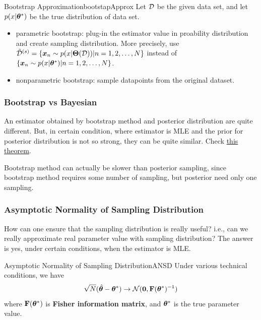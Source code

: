 \documentclass{report}
\begin{document}
                \begin{defn}{Bootstrap Approximation}{bootstapApprox}
                    Let $\mathcal D$ be the given data set, and let $p(x|\boldsymbol{\theta}^*)$ be the true distribution of data set.
                    \begin{itemize}
                        \item parametric bootstrap: plug-in the estimator value in proability distribution and create sampling distribution.
                            More precisely, use $\tilde{\mathcal D}^{(s)} = \{\boldsymbol{x}_n \sim p(x|\boldsymbol{\Theta}(\mathcal D)) | n = 1, 2, \ldots, N\}$
                            instead of $\{\boldsymbol{x}_n \sim p(x|\boldsymbol{\theta}^*) | n = 1, 2, \ldots, N\}$.
                        \item nonparametric bootstrap: sample datapoints from the original dataset.
                    \end{itemize}
                \end{defn}

            \subsubsection{Bootstrap vs Bayesian}
                An estimator obtained by bootstrap method and posterior distribution are quite different.
                But, in certain condition, where estimator is MLE and the prior for posterior distribution is not so strong,
                they can be quite similar. Check \hyperref[thm:ANSD]{this theorem}.

                Bootstrap method can actually be slower than posterior sampling,
                since bootstrap method requires some number of sampling, but posterior need only one sampling.

            \subsubsection{Asymptotic Normality of Sampling Distribution}
                How can one ensure that the sampling distribution is really useful?
                i.e., can we really approximate real parameter value with sampling distribution?
                The answer is yes, under certain conditions, when the estimator is MLE. 

                \begin{thm}{Asymptotic Normality of Sampling Distribution}{ANSD}
                Under various technical conditions, we have
                \[
                \sqrt{N}(\hat{\boldsymbol{\theta}}-\boldsymbol{\theta}^*) \rightarrow \mathcal N(\boldsymbol{0}, \textbf{F}(\boldsymbol{\theta}^*)^{-1})
                \]
                where $\textbf{F}(\boldsymbol{\theta}^*)$ is \textbf{Fisher information matrix}, and $\boldsymbol{\theta}^*$ is the true parameter value.
                \end{thm}
\end{document}
